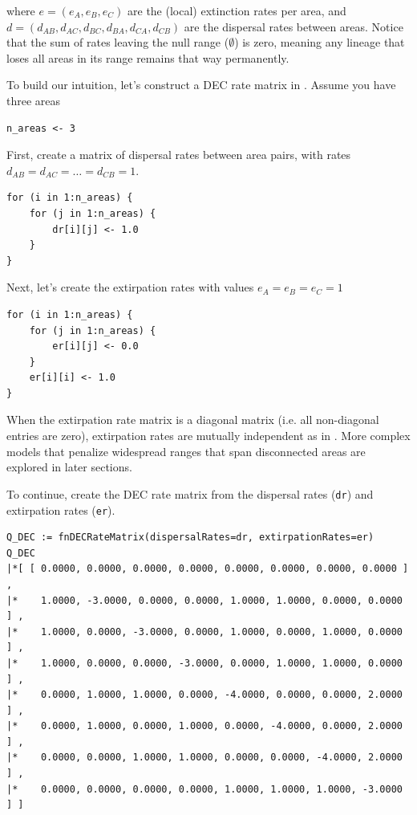 where $e = ( e_A, e_B, e_C )$ are the (local) extinction rates per area, and $d = ( d_{AB}, d_{AC}, d_{BC}, d_{BA}, d_{CA}, d_{CB})$ are the dispersal rates between areas.
Notice that the sum of rates leaving the null range ($\emptyset$) is zero, meaning any lineage that loses all areas in its range remains that way permanently.

To build our intuition, let's construct a DEC rate matrix in \RevBayes.
Assume you have three areas

\begin{snugshade}
\begin{lstlisting}
n_areas <- 3
\end{lstlisting}
\end{snugshade}

First, create a matrix of dispersal rates between area pairs, with rates $d_{AB} = d_{AC} = \ldots = d_{CB} = 1$.

\begin{snugshade}
\begin{lstlisting}
for (i in 1:n_areas) {
    for (j in 1:n_areas) {
        dr[i][j] <- 1.0
    }
}
\end{lstlisting}
\end{snugshade}

Next, let's create the extirpation rates with values $e_A=e_B=e_C=1$

\begin{snugshade}
\begin{lstlisting}
for (i in 1:n_areas) {
    for (j in 1:n_areas) {
        er[i][j] <- 0.0
    }
    er[i][i] <- 1.0
}
\end{lstlisting}
\end{snugshade}

When the extirpation rate matrix is a diagonal matrix (i.e. all non-diagonal entries are zero), extirpation rates are mutually independent as in \citep{Ree2005}.
More complex models that penalize widespread ranges that span disconnected areas are explored in later sections.

To continue, create the DEC rate matrix from the dispersal rates ({\tt dr}) and extirpation rates ({\tt er}).

\begin{snugshade}
\begin{lstlisting}
Q_DEC := fnDECRateMatrix(dispersalRates=dr, extirpationRates=er)
Q_DEC
|*[ [ 0.0000, 0.0000, 0.0000, 0.0000, 0.0000, 0.0000, 0.0000, 0.0000 ] ,
|*    1.0000, -3.0000, 0.0000, 0.0000, 1.0000, 1.0000, 0.0000, 0.0000 ] ,
|*    1.0000, 0.0000, -3.0000, 0.0000, 1.0000, 0.0000, 1.0000, 0.0000 ] ,
|*    1.0000, 0.0000, 0.0000, -3.0000, 0.0000, 1.0000, 1.0000, 0.0000 ] ,
|*    0.0000, 1.0000, 1.0000, 0.0000, -4.0000, 0.0000, 0.0000, 2.0000 ] ,
|*    0.0000, 1.0000, 0.0000, 1.0000, 0.0000, -4.0000, 0.0000, 2.0000 ] ,
|*    0.0000, 0.0000, 1.0000, 1.0000, 0.0000, 0.0000, -4.0000, 2.0000 ] ,
|*    0.0000, 0.0000, 0.0000, 0.0000, 1.0000, 1.0000, 1.0000, -3.0000 ] ]
\end{lstlisting}
\end{snugshade}

